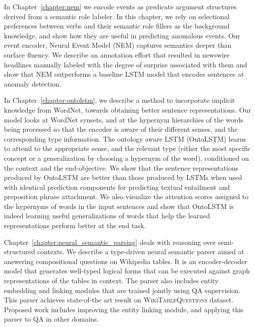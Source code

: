 In Chapter~\ref{chapter:nem} we encode events as predicate argument structures derived from a semantic role labeler.
In this chapter, we rely on selectional preferences between verbs and their semantic role fillers as the background
knowledge, and show how they are useful in predicting anomalous events.
Our event encoder, Neural Event Model (NEM) captures semantics deeper than surface fluency. We describe an annotation effort that
resulted in newswire headlines manually labeled with the degree of surprise associated with them and show that NEM outperforms
a baseline LSTM model that encodes sentences at anomaly detection. 

In Chapter~\ref{chapter:ontolstm}, we describe a method to incorporate implicit knowledge
from WordNet, towards obtaining better sentence representations. Our model looks at WordNet synsets,
and at the hypernym hierarchies of the words being processed so that the 
encoder is aware of their different senses, and the corresponding type information.
The ontology aware LSTM (OntoLSTM) learns to attend to the appropriate sense,
and the relevant type 
(either the most specific concept or a generalization by choosing a hypernym of
the word), conditioned on the context and the end-objective. We show that the sentence representations 
produced by OntoLSTM are better than those produced by LSTMs when used with identical prediction 
components for predicting textual entailment and preposition phrase attachment. We also visualize the attention scores assigned to the hypernyms 
of words in the input sentences and show that OntoLSTM is indeed learning useful generalizations of words
that help the learned representations perform better at the end task.

Chapter~\ref{chapter:neural_semantic_parsing} deals with reasoning over semi-structured contexts. We describe a type-driven
neural semantic parser aimed at answering compositional questions on Wikipedia tables. It is an encoder-decoder model that generates
well-typed logical forms that can be executed against graph representations of the tables in context. The parser also includes entity embedding
and linking modules that are trained jointly using QA supervision. This parser achieves state-of-the art result on \textsc{WikiTableQuestions} dataset.
Proposed work includes improving the entity linking module, and applying this parser to QA in other domains.

